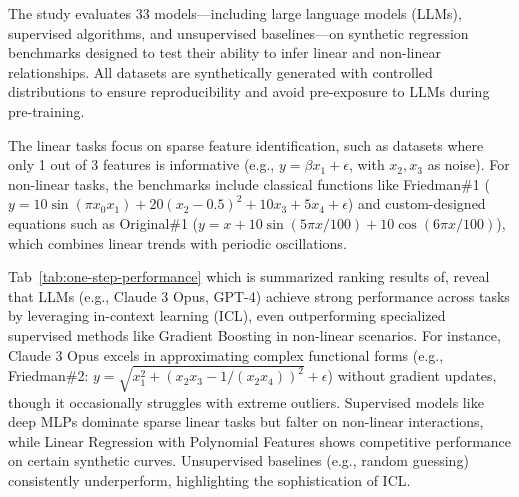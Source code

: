 \documentclass{article}
\begin{document}
The study evaluates 33 models—including large language models (LLMs), supervised algorithms, and unsupervised baselines—on synthetic regression benchmarks designed to test their ability to infer linear and non-linear relationships. All datasets are synthetically generated with controlled distributions to ensure reproducibility and avoid pre-exposure to LLMs during pre-training. 

The linear tasks focus on sparse feature identification, such as datasets where only 1 out of 3 features is informative (e.g., \( y = \beta x_1 + \epsilon \), with \( x_2, x_3 \) as noise). For non-linear tasks, the benchmarks include classical functions like Friedman\#1 (\( y = 10\sin(\pi x_0x_1) + 20(x_2-0.5)^2 + 10x_3 + 5x_4 + \epsilon \)) and custom-designed equations such as Original\#1 (\( y = x + 10\sin(5\pi x/100) + 10\cos(6\pi x/100) \)), which combines linear trends with periodic oscillations.  

Tab~\ref{tab:one-step-performance} which is summarized ranking results of, reveal that LLMs (e.g., Claude 3 Opus, GPT-4) achieve strong performance across tasks by leveraging in-context learning (ICL), even outperforming specialized supervised methods like Gradient Boosting in non-linear scenarios. For instance, Claude 3 Opus excels in approximating complex functional forms (e.g., Friedman\#2: \( y = \sqrt{x_1^2 + (x_2x_3 - 1/(x_2x_4))^2} + \epsilon \)) without gradient updates, though it occasionally struggles with extreme outliers. Supervised models like deep MLPs dominate sparse linear tasks but falter on non-linear interactions, while Linear Regression with Polynomial Features shows competitive performance on certain synthetic curves. Unsupervised baselines (e.g., random guessing) consistently underperform, highlighting the sophistication of ICL.  
\end{document}
